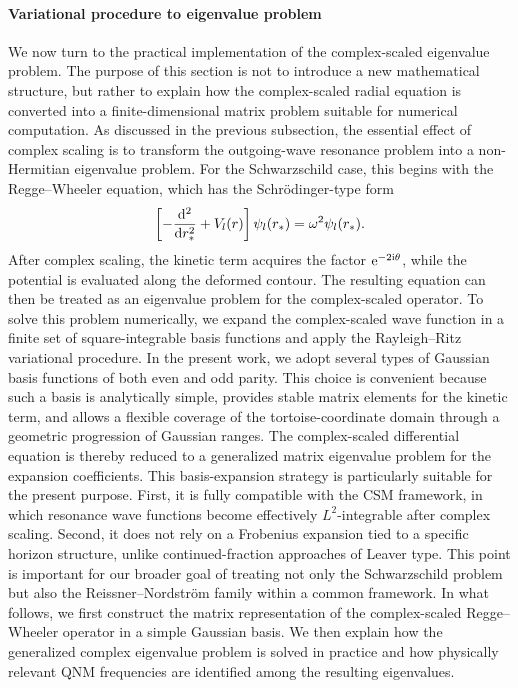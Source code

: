 \paragraph{Variational procedure to eigenvalue problem}
We now turn to the practical implementation of the complex-scaled eigenvalue problem.
The purpose of this section is not to introduce a new mathematical structure, but rather to explain how the complex-scaled radial equation is converted into a finite-dimensional matrix problem suitable for numerical computation.
As discussed in the previous subsection, the essential effect of complex scaling is to transform the outgoing-wave resonance problem into a non-Hermitian eigenvalue problem.
For the Schwarzschild case, this begins with the Regge--Wheeler equation,
which has the Schr\"odinger-type form
\begin{align}
    \left[ -\frac{\mathrm{d}^2}{\mathrm{d} r_*^2} + V_l(r) \right]
    \psi_l(r_*)
    =
    \omega^2 \psi_l(r_*).
    \label{src:2604_20442:eq:rw_schr}
\end{align}
After complex scaling, the kinetic term acquires the factor $\mathrm{e}^{-2 \mathrm{i} \theta}$, while the potential is evaluated along the deformed contour.
The resulting equation can then be treated as an eigenvalue problem for the complex-scaled operator.
To solve this problem numerically, we expand the complex-scaled wave function in a finite set of square-integrable basis functions and apply the Rayleigh--Ritz variational procedure.
In the present work, we adopt several types of Gaussian basis functions of both even and odd parity.
This choice is convenient because such a basis is analytically simple, provides stable matrix elements for the kinetic term, and allows a flexible coverage of the tortoise-coordinate domain through a geometric progression of Gaussian ranges.
The complex-scaled differential equation is thereby reduced to a generalized matrix eigenvalue problem for the expansion coefficients.
This basis-expansion strategy is particularly suitable for the present purpose.
First, it is fully compatible with the CSM framework, in which resonance wave functions become effectively $L^2$-integrable after complex scaling.
Second, it does not rely on a Frobenius expansion tied to a specific horizon structure, unlike continued-fraction approaches of Leaver type.
This point is important for our broader goal of treating not only the Schwarzschild problem but also the Reissner--Nordstr\"om family within a common framework.
In what follows, we first construct the matrix representation of the complex-scaled Regge--Wheeler operator in a simple Gaussian basis.
We then explain how the generalized complex eigenvalue problem is solved in practice and how physically relevant QNM frequencies are identified among the resulting eigenvalues.
